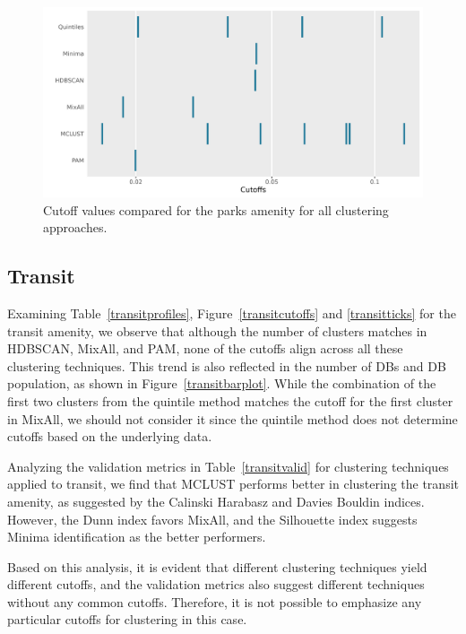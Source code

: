 \documentclass[11pt, a4paper]{article}
\begin{document}
\begin{figure}[H]
\centering
\includegraphics[width=\textwidth]{./cutoff_ticks/Parks_ticks.png}
\caption[Parks cutoff comparison]{Cutoff values compared for the parks amenity for all clustering approaches.}\label{parksticks}
\end{figure}









\justifying
\subsection{Transit}

Examining Table~\ref{transitprofiles}, Figure~\ref{transitcutoffs} and \ref{transitticks} for the transit amenity, we observe that although the number of clusters matches in HDBSCAN, MixAll, and PAM, none of the cutoffs align across all these clustering techniques. This trend is also reflected in the number of DBs and DB population, as shown in Figure~\ref{transitbarplot}. While the combination of the first two clusters from the quintile method matches the cutoff for the first cluster in MixAll, we should not consider it since the quintile method does not determine cutoffs based on the underlying data.
\par
Analyzing the validation metrics in Table~\ref{transitvalid} for clustering techniques applied to transit, we find that MCLUST performs better in clustering the transit amenity, as suggested by the Calinski Harabasz and Davies Bouldin indices. However, the Dunn index favors MixAll, and the Silhouette index suggests Minima identification as the better performers.
\par
Based on this analysis, it is evident that different clustering techniques yield different cutoffs, and the validation metrics also suggest different techniques without any common cutoffs. Therefore, it is not possible to emphasize any particular cutoffs for clustering in this case.
\end{document}
